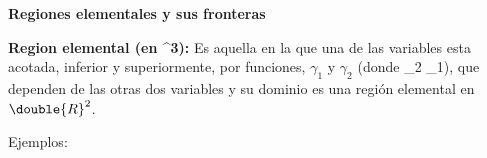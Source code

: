 \documentclass[fleqn]{article}
\begin{document}
    {\Huge \textbf{Regiones elementales y sus fronteras}}

    \textbf{Region elemental (en ^3):} Es aquella en la que una de las variables esta acotada, inferior y superiormente, por funciones, $ \gamma_1 $ y $ \gamma_2 $ (donde \gamma_2 \geq \gamma_1), que dependen de las otras dos variables y su dominio es una región elemental en $ \double{R}^2 $. 

    Ejemplos:

\end{document}

